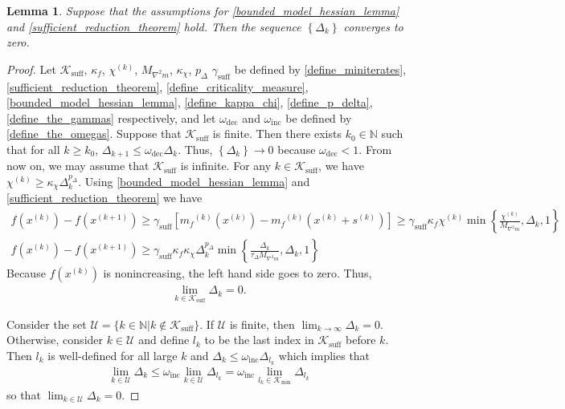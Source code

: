 \documentclass{article}
\newtheorem{lemma}[theorem]{Lemma}
\theoremstyle{case}
\numberwithin{theorem}{subsection}
\newcommand{\chik}{{\chi^{(k)}}}
\newcommand{\dk}{\Delta_k}
\newcommand{\dkpo}{\Delta_{k+1}}
\newcommand{\gammabi}{\gamma_{\textrm{suff}}}
\newcommand{\maxmodelhessian}{{M_{\nabla^2 m}}}
\newcommand{\mfk}{{{m}_f}^{(k)}}
\newcommand{\naturals}{\mathbb N}
\newcommand{\oalpha}{\tau_{\Delta}}
\newcommand{\omegadec}{\omega_{\text{dec}}}
\newcommand{\omegainc}{\omega_{\text{inc}}}
\newcommand{\sk}{{{s}^{(k)}}}
\newcommand{\xkpo}{{{x}^{(k+1)}}}
\newcommand{\xk}{x^{(k)}}
\newcommand{\suffiterates}{{\mathcal K_{\textrm{suff}}}}
\newcommand{\miniterates}{{\mathcal K_{\textrm{min}}}}
\begin{document}
\begin{lemma}
\label{delta_to_zero}
Suppose that the assumptions for
\cref{bounded_model_hessian_lemma} and
\cref{sufficient_reduction_theorem}
hold.
Then the sequence $\left\{\dk\right\}$ converges to zero.
\end{lemma}

\begin{proof}
Let
$\suffiterates$, $\kappa_f$, $\chik$, $\maxmodelhessian$, $\kappa_{\chi}$, $p_{\Delta}$ $\gammabi$
be defined by
\cref{define_miniterates}, \cref{sufficient_reduction_theorem}, \cref{define_criticality_measure}, \cref{bounded_model_hessian_lemma}, \cref{define_kappa_chi}, \cref{define_p_delta}, \cref{define_the_gammas}
respectively,
and let $\omegadec$ and $\omegainc$ be defined by \cref{define_the_omegas}.
Suppose that $\suffiterates$ is finite.
Then there exists $k_0 \in \naturals$ such that for all $k \ge  k_0$, $\dkpo \le \omegadec \dk$.
Thus, $\left\{\dk\right\} \to 0$ because $\omegadec < 1$.
From now on, we may assume that $\suffiterates$ is infinite.  
For any $k \in \suffiterates$, we have $\chik \ge \kappa_{\chi}\dk^{p_{\Delta}}$.
Using \cref{bounded_model_hessian_lemma} and \cref{sufficient_reduction_theorem} we have
\begin{align*}
f\left(\xk\right) - f\left(\xkpo\right) \ge \gammabi \left[\mfk\left(\xk\right) - \mfk\left(\xk + \sk\right)\right] \ge \gammabi \kappa_f \chik \min\left\{\frac{\chik}{\maxmodelhessian}, \dk, 1\right\} \\
f\left(\xk\right) - f\left(\xkpo\right) \ge \gammabi \kappa_f \kappa_{\chi}\dk^{p_{\Delta}}\min\left\{\frac{\dk}{\oalpha \maxmodelhessian}, \dk, 1\right\}
\end{align*}
% 
Because $f\left(\xk\right)$ is nonincreasing, the left hand side goes to zero.
Thus,
\begin{align}
\lim_{k \in \suffiterates} \dk = 0.
\end{align}

Consider the set
$\mathcal U = \{ k \in \naturals | k \not \in \suffiterates \}$.
If $\mathcal U$ is finite, then $\lim_{k\to\infty}\dk = 0$.
Otherwise, consider $k \in \mathcal U$ and define $l_k$ to be the last index in $\suffiterates$ before $k$.
Then $l_k$ is well-defined for all large $k$  and $\dk \le \omegainc \Delta_{l_k}$ which implies that
\begin{align}
\lim_{k \in \mathcal U } \dk \le \omegainc \lim_{k \in \mathcal U} \Delta_{l_k} = \omegainc \lim_{l_k \in \miniterates} \Delta_{l_k}
\end{align}
so that $\lim_{k \in \mathcal U} \dk = 0$.
\end{proof}
\end{document}
